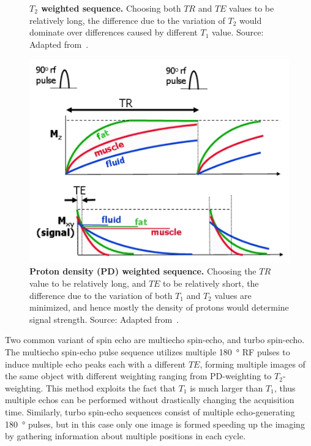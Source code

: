 \begin{figure}[thb]
\begin{minipage}[t]{.28\textwidth}
        \caption{\textbf{$T_2$ weighted sequence.} Choosing both $TR$ and $TE$ values to be relatively long, the difference due to the variation of $T_2$ would dominate over differences caused by different $T_1$ value. Source: Adapted from~\cite{ridgway_cardiovascular_2010}.}
        \label{fig:T2_weighted}
    \end{minipage}%
    \hspace{0.02\textwidth}
    \begin{minipage}[t]{0.34\textwidth}
        \centering
        \includegraphics[width=.85\linewidth]{images/PD_weighted.png}
        \caption{\textbf{Proton density (PD) weighted sequence.} Choosing the $TR$ value to be relatively long, and $TE$ to be relatively short, the difference due to the variation of both $T_1$ and $T_2$ values are minimized, and hence mostly the density of protons would determine signal strength. Source: Adapted from~\cite{ridgway_cardiovascular_2010}.}
        \label{fig:PD_weighted}
    \end{minipage}
\end{figure}

Two common variant of spin echo are multiecho spin-echo, and turbo spin-echo. The multiecho spin-echo pulse sequence utilizes multiple \SI{180}{\degree} RF pulses to induce multiple echo peaks each with a different $TE$, forming multiple images of the same object with different weighting ranging from PD-weighting to $T_2$-weighting. This method exploits the fact that $T_1$ is much larger than $T_1$, thus multiple echos can be performed without drastically changing the acquisition time. Similarly, turbo spin-echo sequences consist of multiple echo-generating \SI{180}{\degree} pulses, but in this case only one image is formed speeding up the imaging by gathering information about multiple positions in each cycle.

